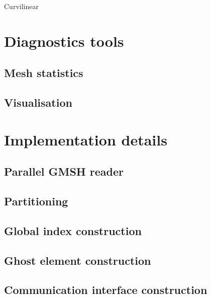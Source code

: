 \documentclass[12pt]{article}
\begin{document}
Curvilinear 




\section{Diagnostics tools}
\subsection{Mesh statistics}
\subsection{Visualisation}

\section{Implementation details}
\subsection{Parallel GMSH reader}
\subsection{Partitioning}
\subsection{Global index construction}
\subsection{Ghost element construction}
\subsection{Communication interface construction}

%
%


\printindex
\end{document}
